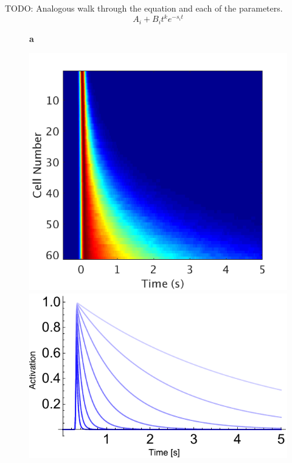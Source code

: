 \documentclass{apa}
\begin{document}
TODO: Analogous walk through the equation and each of the parameters.
\begin{equation}
		A_i + B_i  t^k e^{ -s_i t}
\end{equation}

\begin{figure}
	\begin{minipage}{.25\linewidth}
		\textbf{a}
		\begin{center}
			\includegraphics[width=.99\linewidth]{figs/HeatmapExpDecayV2.png}
			\includegraphics[width=.99\linewidth]{figs/ExpDecParams.pdf}
		\end{center}
	\end{minipage}

\end{figure}
\end{document}

